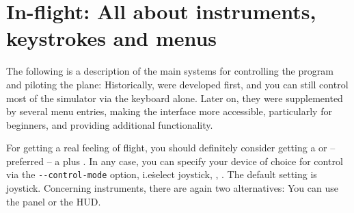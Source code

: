 \emph{}%

\chapter{In-flight: All about instruments, keystrokes and menus\label{flight}}

The following is a description of the main systems for controlling the
program and piloting the plane: Historically,  were developed
first, and you can still control most of the simulator via the keyboard alone. Later on,
they were supplemented by several menu entries, making the interface more accessible,
particularly for beginners, and providing additional functionality. 

For getting a real feeling of flight, you should definitely consider
getting a  or -- preferred -- a  plus
. In any case, you can specify your device of
choice for control via the \texttt{-$ $-control-mode} option, i.e\.
select joystick, , . The default setting
is joystick. Concerning instruments, there are again two alternatives:
You can use the panel or the HUD.

